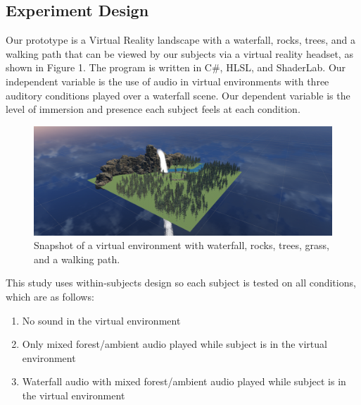 \documentclass[manuscript,screen,review]{acmart}
\begin{document}
\subsection{Experiment Design}
Our prototype is a Virtual Reality landscape with a waterfall, rocks, trees, and a walking path that can be viewed by our subjects via a virtual reality headset, as shown in Figure 1. The program is written in C\#, HLSL, and ShaderLab. Our independent variable is the use of audio in virtual environments with three auditory conditions played over a waterfall scene. Our dependent variable is the level of immersion and presence each subject feels at each condition.


\begin{figure}[ht]
  \centering
  \includegraphics[width=\linewidth]{CP2-world.png}
  \caption{Snapshot of a virtual environment with waterfall, rocks, trees, grass, and a walking path.}
\end{figure}
	

This study uses within-subjects design so each subject is tested on all conditions, which are as follows:

\begin{enumerate}
    \item No sound in the virtual environment
    \item Only mixed forest/ambient audio played while subject is in the virtual environment
    \item Waterfall audio with mixed forest/ambient audio played while subject is in the virtual environment
\end{enumerate}
\end{document}
